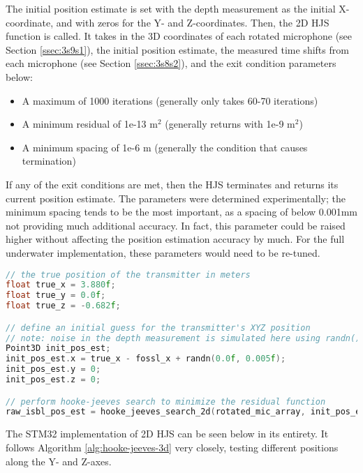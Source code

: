 \documentclass[11pt]{ucthesisCP}
\begin{document}
The initial position estimate is set with the depth measurement as the initial X-coordinate, and with zeros for the Y- and Z-coordinates. Then, the 2D HJS function is called. It takes in the 3D coordinates of each rotated microphone (see Section \ref{ssec:3s9s1}), the initial position estimate, the measured time shifts from each microphone (see Section \ref{ssec:3s8s2}), and the exit condition parameters below:

\begin{itemize}[noitemsep,topsep=0pt,]
	\item A maximum of 1000 iterations (generally only takes 60-70 iterations)
	\item A minimum residual of 1e-13 m$^2$ (generally returns with 1e-9 m$^2$)
	\item A minimum spacing of 1e-6 m (generally the condition that causes termination)
\end{itemize}

If any of the exit conditions are met, then the HJS terminates and returns its current position estimate. The parameters were determined experimentally; the minimum spacing tends to be the most important, as a spacing of below 0.001mm not providing much additional accuracy. In fact, this parameter could be raised higher without affecting the position estimation accuracy by much. For the full underwater implementation, these parameters would need to be re-tuned.

\begin{lstlisting}[language=C++]
// the true position of the transmitter in meters
float true_x = 3.880f;
float true_y = 0.0f;
float true_z = -0.682f;

// define an initial guess for the transmitter's XYZ position
// note: noise in the depth measurement is simulated here using randn()
Point3D init_pos_est;
init_pos_est.x = true_x - fossl_x + randn(0.0f, 0.005f);
init_pos_est.y = 0;
init_pos_est.z = 0;

// perform hooke-jeeves search to minimize the residual function
raw_isbl_pos_est = hooke_jeeves_search_2d(rotated_mic_array, init_pos_est, measured_time_shifts, 1000, 1e-13, 1e-6, 2.0f);
\end{lstlisting}

The STM32 implementation of 2D HJS can be seen below in its entirety. It follows Algorithm \ref{alg:hooke-jeeves-3d} very closely, testing different positions along the Y- and Z-axes.
\end{document}
